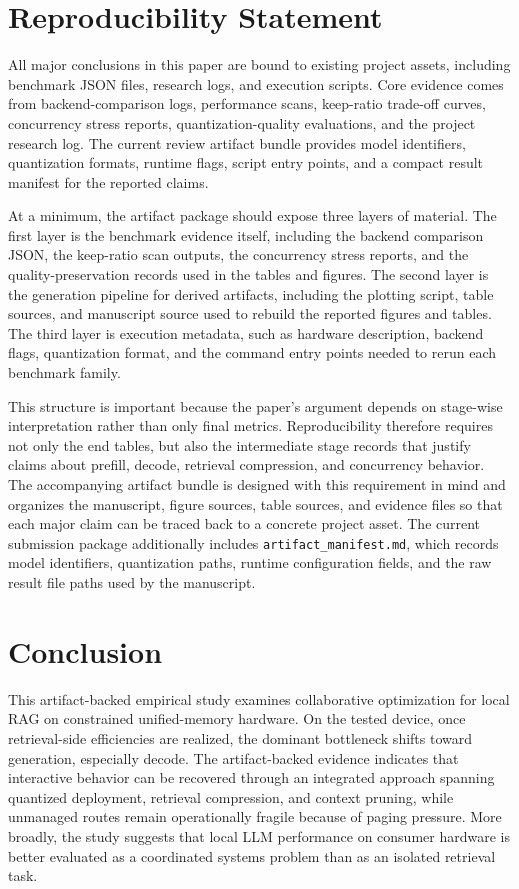\documentclass[10pt,twocolumn]{article}
\begin{document}
\section{Reproducibility Statement}

All major conclusions in this paper are bound to existing project assets, including benchmark JSON files, research logs, and execution scripts. Core evidence comes from backend-comparison logs, performance scans, keep-ratio trade-off curves, concurrency stress reports, quantization-quality evaluations, and the project research log. The current review artifact bundle provides model identifiers, quantization formats, runtime flags, script entry points, and a compact result manifest for the reported claims.

At a minimum, the artifact package should expose three layers of material. The first layer is the benchmark evidence itself, including the backend comparison JSON, the keep-ratio scan outputs, the concurrency stress reports, and the quality-preservation records used in the tables and figures. The second layer is the generation pipeline for derived artifacts, including the plotting script, table sources, and manuscript source used to rebuild the reported figures and tables. The third layer is execution metadata, such as hardware description, backend flags, quantization format, and the command entry points needed to rerun each benchmark family.

This structure is important because the paper's argument depends on stage-wise interpretation rather than only final metrics. Reproducibility therefore requires not only the end tables, but also the intermediate stage records that justify claims about prefill, decode, retrieval compression, and concurrency behavior. The accompanying artifact bundle is designed with this requirement in mind and organizes the manuscript, figure sources, table sources, and evidence files so that each major claim can be traced back to a concrete project asset. The current submission package additionally includes \texttt{artifact\_manifest.md}, which records model identifiers, quantization paths, runtime configuration fields, and the raw result file paths used by the manuscript.

\section{Conclusion}

This artifact-backed empirical study examines collaborative optimization for local RAG on constrained unified-memory hardware. On the tested device, once retrieval-side efficiencies are realized, the dominant bottleneck shifts toward generation, especially decode. The artifact-backed evidence indicates that interactive behavior can be recovered through an integrated approach spanning quantized deployment, retrieval compression, and context pruning, while unmanaged routes remain operationally fragile because of paging pressure. More broadly, the study suggests that local LLM performance on consumer hardware is better evaluated as a coordinated systems problem than as an isolated retrieval task.
\end{document}
